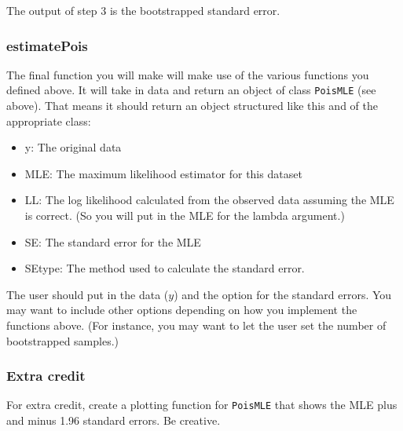 \documentclass[
]{article}
\providecommand{\tightlist}{%
  \setlength{\itemsep}{0pt}\setlength{\parskip}{0pt}}
\begin{document}
The output of step 3 is the bootstrapped standard error.

\hypertarget{estimatepois}{%
\subsubsection{estimatePois}\label{estimatepois}}

The final function you will make will make use of the various functions
you defined above. It will take in data and return an object of class
\texttt{PoisMLE} (see above). That means it should return an object
structured like this and of the appropriate class:

\begin{itemize}
\tightlist
\item
  y: The original data
\item
  MLE: The maximum likelihood estimator for this dataset
\item
  LL: The log likelihood calculated from the observed data assuming the
  MLE is correct. (So you will put in the MLE for the lambda argument.)
\item
  SE: The standard error for the MLE
\item
  SEtype: The method used to calculate the standard error.
\end{itemize}

The user should put in the data (\(y\)) and the option for the standard
errors. You may want to include other options depending on how you
implement the functions above. (For instance, you may want to let the
user set the number of bootstrapped samples.)

\hypertarget{extra-credit}{%
\subsubsection{Extra credit}\label{extra-credit}}

For extra credit, create a plotting function for \texttt{PoisMLE} that
shows the MLE plus and minus 1.96 standard errors. Be creative.
\end{document}
